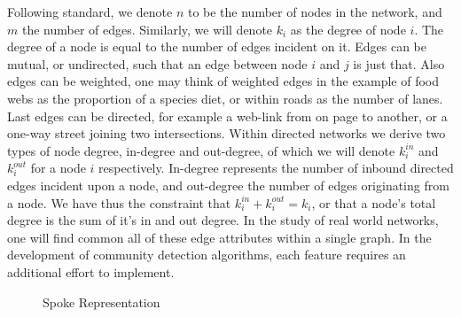 \documentclass[a4paper, 10pt, twocolumn]{article}
\begin{document}
Following standard, we denote $ n $ to be the number of nodes in the network, and $ m $ the number of edges. 
Similarly, we will denote $ k_i $ as the degree of node $ i $. 
The degree of a node is equal to the number of edges incident on it.
Edges can be mutual, or undirected, such that an edge between node $ i $ and $ j $ is just that. 
Also edges can be weighted, one may think of weighted edges in the example of food webs as the proportion of a species diet, or within roads as the number of lanes. 
Last edges can be directed, for example a web-link from on page to another, or a one-way street joining two intersections.
Within directed networks we derive two types of node degree, in-degree and out-degree, of which we will denote $ k_{i}^{in} $ and $ k_{i}^{out} $ for a node $ i $ respectively.
In-degree represents the number of inbound directed edges incident upon a node, and out-degree the number of edges originating from a node. 
We have thus the constraint that $ k_{i}^{in} + k_{i}^{out} = k_{i} $, or that a node's total degree is the sum of it's in and out degree. 
In the study of real world networks, one will find common all of these edge attributes within a single graph.
In the development of community detection algorithms, each feature requires an additional effort to implement. 

\begin{figure}[b]
       \centering
       \caption{Spoke Representation}
       \label{fig:spokes}
\end{figure}    
\end{document}

